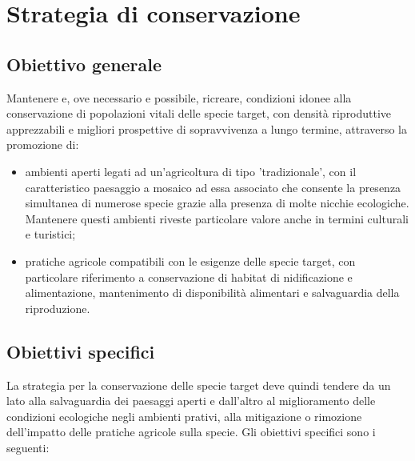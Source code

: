 \documentclass[10pt,twoside,openany,x11names,svgnames,italian,a5paper,dvipsnames,table]{memoir}
\newcommand\chapterillustration{}
\begin{document}
 
\chapter{Strategia di conservazione}
\renewcommand\chapterillustration{3.JPG}
\section{Obiettivo generale}
Mantenere e, ove necessario e possibile, ricreare, condizioni idonee alla conservazione di popolazioni vitali delle specie target, con densità riproduttive apprezzabili e migliori prospettive di sopravvivenza a lungo termine, attraverso la promozione di:
\begin{itemize}\itemsep0pt
  \item ambienti aperti legati ad un'agricoltura di tipo 'tradizionale', con il caratteristico paesaggio a mosaico ad essa associato che consente la presenza simultanea di numerose specie grazie alla presenza di molte nicchie ecologiche. Mantenere questi ambienti riveste particolare valore anche in termini culturali e turistici;
  \item pratiche agricole compatibili con le esigenze delle specie target, con particolare riferimento a conservazione di habitat di nidificazione e alimentazione, mantenimento di disponibilità alimentari e salvaguardia della riproduzione.
\end{itemize}

\section{Obiettivi specifici}
La strategia per la conservazione delle specie target deve quindi tendere da un lato alla salvaguardia dei paesaggi aperti e dall'altro al miglioramento delle condizioni ecologiche negli ambienti prativi, alla mitigazione o rimozione dell’impatto delle pratiche agricole sulla specie.
Gli obiettivi specifici sono i seguenti:
\end{document}
